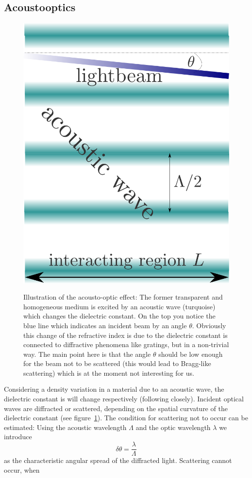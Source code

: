 \subsection{Acoustooptics}
\begin{figure}
    \centering
    \caption{Illustration of the acousto-optic effect: The former transparent and homogeneous medium is
        excited by an acoustic wave (turquoise) which changes the dielectric constant. On the top you notice
        the blue line which indicates an incident beam by an angle $\theta$. Obviously this change
        of the refractive index is due to the dielectric constant is connected to diffractive phenomena like
        gratings, but in a non-trivial way. The main point here is that the angle $\theta$ should be low enough
        for the beam not to be scattered (this would lead to Bragg-like scattering) which is at the moment
        not interesting for us. }
    \includegraphics[width=0.5\linewidth]{figures/ramannath1.png}
    \label{fig:ramannath1}
\end{figure}
Considering a density variation in a material due to an acoustic wave, the dielectric constant is will
change respectively (following \cite{boyd2003nonlinear} closely). 
Incident optical waves are diffracted or scattered, depending on the spatial curvature
of the dielectric constant (see figure~\ref{fig:ramannath1}). The condition for scattering not to occur can
be estimated: Using the acoustic wavelength $\Lambda$ and the optic wavelength $\lambda$ we introduce 
\begin{equation}
    \label{eq:deltatheta}
    \delta \theta = \frac{\lambda}{\Lambda}
\end{equation}
as the characteristic angular spread of the diffracted light. Scattering cannot occur, when 
